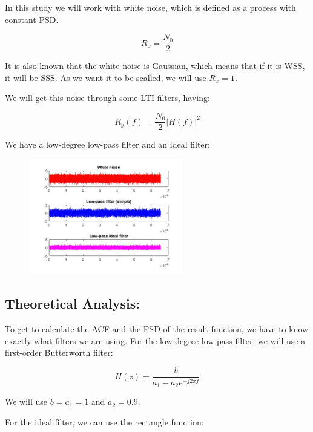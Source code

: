 \documentclass[a4paper,11pt]{article}
\begin{document}
In this study we will work with white noise, which is defined as a process with constant PSD.

\begin{equation}R_0 = \frac{N_0}{2}\end{equation} 

It is also known that the white noise is Gaussian, which means that if it is WSS, it will be SSS. As we want it to be scalled, we will use $R_x=1$.

We will get this noise through some LTI filters, having:

\begin{equation}R_y(f) = \frac{N_0}{2}|H(f)|^2\end{equation} 

We have a low-degree low-pass filter and an ideal filter:

\begin{figure}[!hp]
    \begin{center}
    \includegraphics[width=0.6\textwidth]{images/ruidos.jpg}
    \end{center}
\end{figure}

\subsection{Theoretical Analysis:}

To get to calculate the ACF and the PSD of the result function, we have to know exactly what filters we are using. For the low-degree low-pass filter, we will use a first-order Butterworth filter:

\begin{equation}H(z) = \frac{b}{a_1-a_2e^{-j2 \pi f}}\end{equation}

We will use $b = a_1 = 1$ and $a_2 = 0.9$.

For the ideal filter, we can use the rectangle function:
\end{document}
